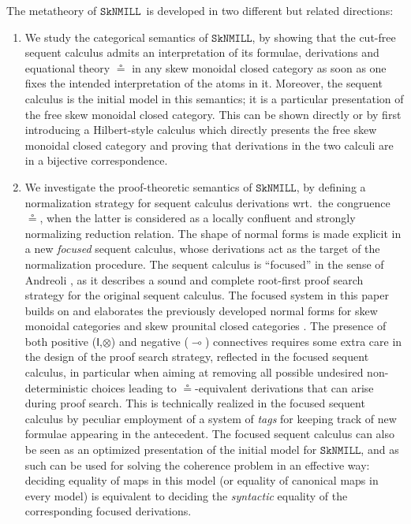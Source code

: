 \documentclass[copyright,creativecommons]{eptcs}
\theoremstyle{definition}
\newcommand{\ot}{\otimes}
\newcommand{\lolli}{\multimap}
\newcommand{\I}{\mathsf{I}}
\newcommand{\SkNMILL}{$\mathtt{SkNMILL}$}
\begin{document}
The metatheory of \SkNMILL\ is developed in two different but related directions:
\begin{enumerate}[($i$)]
  \item We study the categorical semantics of \SkNMILL, by showing that the cut-free sequent calculus admits an interpretation of its formulae, derivations and equational theory $\circeq$ in any skew monoidal closed category as soon as one fixes the intended interpretation of the atoms in it. Moreover, the sequent calculus is the initial model in this semantics; it is a particular presentation of the free skew monoidal closed category. This can be shown directly or by first introducing a Hilbert-style calculus which directly presents the free skew monoidal closed category and proving that derivations in the two calculi are in a bijective correspondence.

\item We investigate the proof-theoretic semantics of \SkNMILL, by defining a normalization strategy for sequent calculus derivations wrt.\ the congruence $\circeq$, when the latter is considered as a locally confluent and strongly normalizing reduction relation. The shape of normal forms is made explicit in a new \emph{focused} sequent calculus, whose derivations act as the target of the normalization procedure. The sequent calculus is ``focused'' in the sense of Andreoli \cite{andreoli:logic:1992}, as it describes a sound and complete root-first proof search strategy for the original sequent calculus. The focused system in this paper builds on and elaborates the previously
developed normal forms for skew monoidal categories \cite{uustalu:sequent:2021} and skew prounital closed categories \cite{uustalu:deductive:nodate}. The presence of both positive ($\I$,$\ot$) and negative ($\lolli$) connectives requires some extra care in the design of the proof search strategy, reflected in the focused sequent calculus, in particular when aiming at removing all possible undesired non-deterministic choices leading to $\circeq$-equivalent derivations that can arise during proof search. This is technically realized in the focused sequent calculus by peculiar employment of a system of \emph{tags} for keeping track of new formulae appearing in the antecedent. The focused sequent calculus can also be seen as an optimized presentation of the initial model for \SkNMILL, and as such can be used for solving the coherence problem in an effective way: deciding equality of maps in this model (or equality of canonical maps in every model) is equivalent to deciding the \emph{syntactic} equality of the corresponding focused derivations.
\end{enumerate}
\end{document}
